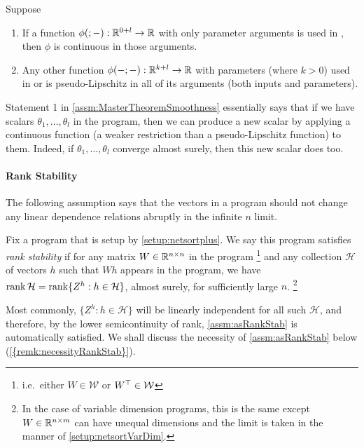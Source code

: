 \documentclass[main.tex]{subfiles}
\begin{document}
\begin{assm}
    \label{assm:MasterTheoremSmoothness}
    Suppose
    \begin{enumerate}
        \item If a function $\phi(;-): \mathbb{R}^{0 + l} \to \mathbb{R}$ with only parameter arguments is used in , then $\phi$ is continuous in those arguments.
        \item Any other function $\phi(-;-): \mathbb{R}^{k + l} \to \mathbb{R}$ with parameters (where $k>0$) used in  or  is pseudo-Lipschitz in all of its arguments (both inputs and parameters).
    \end{enumerate}
\end{assm}
Statement 1 in \cref{assm:MasterTheoremSmoothness} essentially says that if we have scalars $\theta_1, \ldots, \theta_l$ in the program, then we can produce a new scalar by applying a continuous function (a weaker restriction than a pseudo-Lipschitz function) to them.
Indeed, if $\theta_1, \ldots, \theta_l$ converge almost surely, then this new scalar does too.

\paragraph*{Rank Stability}

The following assumption says that the vectors in a program should not change any linear dependence relations abruptly in the infinite $n$ limit.

\begin{assm}\label{assm:asRankStab}
    Fix a \netsortplus{} program that is setup by \cref{setup:netsortplus}.
    We say this program satisfies \emph{rank stability} if for any matrix $W\in\mathbb{R}^{n\times n}$ in the program%
    \footnote{i.e.\ either $W\in\mathcal{W}$ or $W^{\top}\in\mathcal{W}$}
    and any collection $\mathcal{H}$ of vectors $h$ such that $Wh$ appears in the program, we have $\operatorname{rank} \mathcal{H} = \operatorname{rank} \{Z^{h}:h\in\mathcal{H}\}$, almost surely, for sufficiently large $n$.%
    \footnote{In the case of variable dimension \netsortplus{} programs, this is the same except $W\in \mathbb{R}^{n\times m}$ can have unequal dimensions and the limit is taken in the manner of \cref{setup:netsortVarDim}.}
\end{assm}

Most commonly, $\{Z^{h}:h\in\mathcal{H}\}$ will be linearly independent for all such $\mathcal H$, and therefore, by the lower semicontinuity of rank, \cref{assm:asRankStab} is automatically satisfied.
We shall discuss the necessity of \cref{assm:asRankStab} below (\cref{{remk:necessityRankStab}}).
\end{document}
